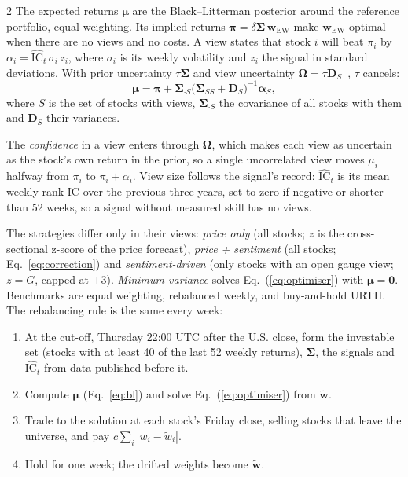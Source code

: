 \begin{multicols}{2}
The expected returns $\boldsymbol\mu$ are the Black--Litterman posterior around the reference portfolio, equal weighting. Its implied returns $\boldsymbol\pi = \delta \boldsymbol\Sigma\, \mathbf w_{\mathrm{EW}}$ make $\mathbf w_{\mathrm{EW}}$ optimal when there are no views and no costs. A view states that stock $i$ will beat $\pi_i$ by $\alpha_i = \widehat{\mathrm{IC}}_t\, \sigma_i\, z_i$, where $\sigma_i$ is its weekly volatility and $z_i$ the signal in standard deviations. With prior uncertainty $\tau\boldsymbol\Sigma$ and view uncertainty $\boldsymbol\Omega = \tau \mathbf D_S$~\cite{blacklitterman,helitterman}, $\tau$ cancels:
\begin{equation}\label{eq:bl}
\boldsymbol\mu = \boldsymbol\pi + \boldsymbol\Sigma_{\cdot S} \bigl(\boldsymbol\Sigma_{SS} + \mathbf D_S\bigr)^{-1} \boldsymbol\alpha_S ,
\end{equation}
where $S$ is the set of stocks with views, $\boldsymbol\Sigma_{\cdot S}$ the covariance of all stocks with them and $\mathbf D_S$ their variances.

The \emph{confidence} in a view enters through $\boldsymbol\Omega$, which makes each view as uncertain as the stock's own return in the prior, so a single uncorrelated view moves $\mu_i$ halfway from $\pi_i$ to $\pi_i + \alpha_i$. View size follows the signal's record: $\widehat{\mathrm{IC}}_t$ is its mean weekly rank IC over the previous three years, set to zero if negative or shorter than 52 weeks, so a signal without measured skill has no views.

The strategies differ only in their views: \emph{price only} (all stocks; $z$ is the cross-sectional z-score of the price forecast), \emph{price + sentiment} (all stocks; Eq.~\ref{eq:correction}) and \emph{sentiment-driven} (only stocks with an open gauge view; $z = G$, capped at $\pm 3$). \emph{Minimum variance} solves Eq.~(\ref{eq:optimiser}) with $\boldsymbol\mu = \mathbf 0$. Benchmarks are equal weighting, rebalanced weekly, and buy-and-hold URTH. The rebalancing rule is the same every week:
\begin{enumerate}
\item At the cut-off, Thursday 22:00 UTC after the U.S. close, form the investable set (stocks with at least 40 of the last 52 weekly returns), $\boldsymbol\Sigma$, the signals and $\widehat{\mathrm{IC}}_t$ from data published before it.
\item Compute $\boldsymbol\mu$ (Eq.~\ref{eq:bl}) and solve Eq.~(\ref{eq:optimiser}) from $\tilde{\mathbf w}$.
\item Trade to the solution at each stock's Friday close, selling stocks that leave the universe, and pay $c \sum_i |w_i - \tilde w_i|$.
\item Hold for one week; the drifted weights become $\tilde{\mathbf w}$.
\end{enumerate}
\end{multicols}
